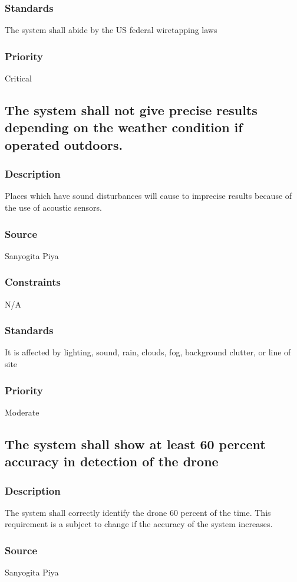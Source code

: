 \subsubsection{Standards}
The system shall abide by the US federal wiretapping laws
\subsubsection{Priority}
Critical

\subsection{The system shall not give precise results depending on the weather condition if operated outdoors.}
\subsubsection{Description}
Places which have sound disturbances will cause to imprecise results because of the use of acoustic sensors.
\subsubsection{Source}
Sanyogita Piya
\subsubsection{Constraints}
N/A
\subsubsection{Standards}
It is affected by lighting, sound, rain, clouds, fog, background clutter, or line of site
\subsubsection{Priority}
Moderate

\subsection{The system shall show at least 60 percent accuracy in detection of the drone}
\subsubsection{Description}
The system shall correctly identify the drone 60 percent of the time. This requirement is a subject to change if the accuracy of the system increases.
\subsubsection{Source}
Sanyogita Piya
